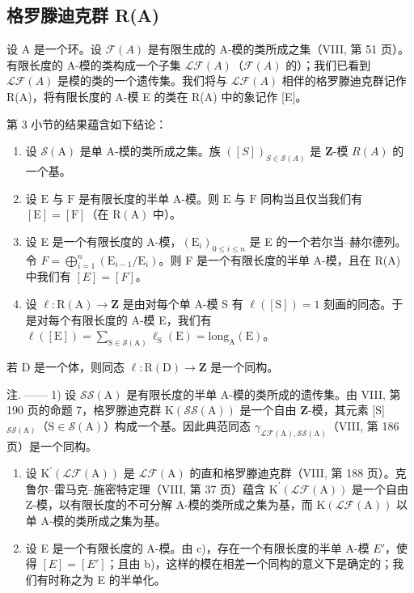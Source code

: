 \subsection{格罗滕迪克群 R(A)}

设 A 是一个环。设 \(\mathcal{F}(A)\) 是有限生成的 A-模的类所成之集（VIII, 第 51 页）。有限长度的 A-模的类构成一个子集 \(\mathcal{L}\mathcal{F}(A)\)（\(\mathcal{F}(A)\) 的）；我们已看到 \(\mathcal{L}\mathcal{F}(A)\) 是模的类的一个遗传集。我们将与 \(\mathcal{L}\mathcal{F}(A)\) 相伴的格罗滕迪克群记作 R(A)，将有限长度的 A-模 E 的类在 R(A) 中的象记作 {[}E{]}。

第 3 小节的结果蕴含如下结论：

\begin{enumerate}
\def\labelenumi{\alph{enumi})}
\item
  设 \(\mathcal{S}(\mathrm{A})\) 是单 A-模的类所成之集。族 \(([S])_{S\in \mathcal{S}(A)}\) 是 \(\mathbf{Z}\)-模 \(R(A)\) 的一个基。
\item
  设 \(\mathrm{E}\) 与 \(\mathrm{F}\) 是有限长度的半单 A-模。则 \(\mathrm{E}\) 与 \(\mathrm{F}\) 同构当且仅当我们有 \([\mathrm{E}] = [\mathrm{F}]\)（在 \(\mathrm{R(A)}\) 中）。
\item
  设 E 是一个有限长度的 A-模，\((\mathrm{E}_{i})_{0\leqslant i\leqslant n}\) 是 E 的一个若尔当–赫尔德列。令 \(F=\bigoplus_{i=1}^{n}(\mathrm{E}_{i-1}/\mathrm{E}_{i})\)。则 F 是一个有限长度的半单 A-模，且在 R(A) 中我们有 \([E]=[F]\)。
\item
  设 \(\ell : \mathrm{R}(\mathrm{A}) \to \mathbf{Z}\) 是由对每个单 A-模 S 有 \(\ell([\mathrm{S}]) = 1\) 刻画的同态。于是对每个有限长度的 A-模 E，我们有 \(\ell([\mathrm{E}]) = \sum_{\mathrm{S} \in \mathcal{S}(\mathrm{A})} \ell_{\mathrm{S}}(\mathrm{E}) = \mathrm{long}_{\mathrm{A}}(\mathrm{E})\)。
\end{enumerate}

若 D 是一个体，则同态 \(\ell: \mathrm{R}(\mathrm{D}) \to \mathbf{Z}\) 是一个同构。

注. —— 1) 设 \(\mathcal{S}\mathcal{S}(\mathrm{A})\) 是有限长度的半单 A-模的类所成的遗传集。由 VIII, 第 190 页的命题 7，格罗滕迪克群 \(\mathrm{K}(\mathcal{S}\mathcal{S}(\mathrm{A}))\) 是一个自由 \(\mathbf{Z}\)-模，其元素 {[}S{]} \(_{\mathcal{S}\mathcal{S}(\mathrm{A})}\)（\(\mathrm{S} \in \mathcal{S}(\mathrm{A})\)）构成一个基。因此典范同态 \(\gamma_{\mathcal{L}\mathcal{F}(\mathrm{A}),\mathcal{S}\mathcal{S}(\mathrm{A})}\)（VIII, 第 186 页）是一个同构。

\begin{enumerate}
\def\labelenumi{\arabic{enumi})}
\setcounter{enumi}{1}
\item
  设 \(\mathrm{K}^{\prime}(\mathcal{L}\mathcal{F}(\mathrm{A}))\) 是 \(\mathcal{L}\mathcal{F}(\mathrm{A})\) 的直和格罗滕迪克群（VIII, 第 188 页）。克鲁尔–雷马克–施密特定理（VIII, 第 37 页）蕴含 \(\mathrm{K}^{\prime}(\mathcal{L}\mathcal{F}(\mathrm{A}))\) 是一个自由 Z-模，以有限长度的不可分解 A-模的类所成之集为基，而 \(\mathrm{K}(\mathcal{L}\mathcal{F}(\mathrm{A}))\) 以单 A-模的类所成之集为基。
\item
  设 E 是一个有限长度的 A-模。由 c)，存在一个有限长度的半单 A-模 \(E'\)，使得 \([E] = [E']\)；且由 b)，这样的模在相差一个同构的意义下是确定的；我们有时称之为 E 的半单化。
\end{enumerate}

